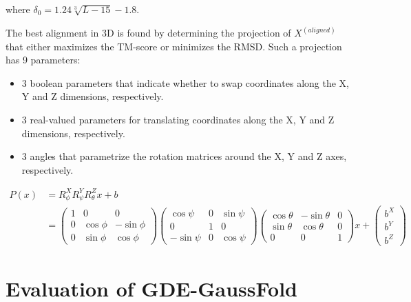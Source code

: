     where $\delta_0 = 1.24 \sqrt[3]{L - 15} - 1.8$.

    The best alignment in 3D is found by determining the projection of $X^{(aligned)}$ that
    either maximizes the TM-score or minimizes the RMSD.
    Such a projection has 9 parameters:
    \begin{itemize}
        \item 3 boolean parameters that indicate whether to swap coordinates along
        the X, Y and Z dimensions, respectively.
        \item 3 real-valued parameters for translating coordinates along the X, Y and Z
        dimensions, respectively.
        \item 3 angles that parametrize the rotation matrices around the X, Y and Z axes,
        respectively.
    \end{itemize}

    \begin{align*}
        P(x) & = R^X_{\phi} R^Y_{\psi} R^Z_{\theta} x + b \\
        & =
        \begin{pmatrix}
        1 & 0 & 0 \\
        0 & \cos{\phi} & -\sin{\phi} \\
        0 & \sin{\phi} & \cos{\phi}
        \end{pmatrix}
        \begin{pmatrix}
        \cos{\psi} & 0 & \sin{\psi} \\
        0 & 1 & 0 \\
        -\sin{\psi} & 0 & \cos{\psi}
        \end{pmatrix}
        \begin{pmatrix}
        \cos{\theta} & -\sin{\theta} & 0 \\
        \sin{\theta} & \cos{\theta} & 0 \\
        0 & 0 & 1
        \end{pmatrix}
        x +
        \begin{pmatrix}
        b^X \\
        b^Y \\
        b^Z
        \end{pmatrix}
    \end{align*}

\section{Evaluation of GDE-GaussFold}

